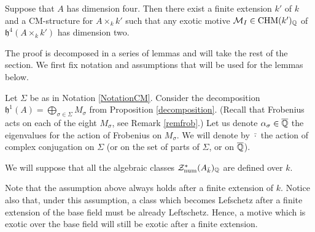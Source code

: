 \documentclass[11pt]{amsart}
\begin{document}
\begin{proposition}\label{exoticdim2}
Suppose that $A$ has dimension four. Then there exist a finite extension $k'$ of $k$ and a  CM-structure for $A\times_k k'$ such that any exotic motive $\mathcal{M}_I \in\mathrm{CHM} (k')_{\mathbb{Q}}$  of $\mathfrak{h}^{4}(A\times_k k')$ has dimension two. 
\end{proposition}

The proof is decomposed in a series of lemmas and will take the rest of the section. We first fix notation and assumptions that will be used for the lemmas below.
\begin{notation}\label{notnotnot}
Let $\Sigma$ be as in Notation \ref{NotationCM}. Consider the decomposition $\mathfrak{h}^1(A) =\bigoplus_{\sigma \in \Sigma} M_\sigma$ from Proposition \ref{decomposition}. (Recall that  Frobenius acts on each of the eight $ M_\sigma$, see Remark \ref{remfrob}.) Let us denote  $\alpha_\sigma \in \overline{\mathbb{Q}}$ the  eigenvalues for the action of  Frobenius on  $ M_\sigma$. We will denote by $\bar{\cdot}$ the action of  complex conjugation on $ \Sigma$ (or on the set of parts of $ \Sigma$, or on $\overline{\mathbb{Q}}$). 
 
\end{notation}
\begin{assumption}\label{assumassum}
We will suppose that all the algebraic classes $\mathcal{Z}^*_{\mathrm{num}} (A_{\bar{k}})_{\mathbb{Q}}$ are defined over $k$. \end{assumption}
\begin{remark}\label{assumptionlef}
Note that the assumption above always holds after a finite extension of $k$. Notice also that, under this assumption, a class which becomes Lefschetz after a finite extension of the base field must be already Leftschetz. Hence, a motive which is exotic over the base field will still be exotic after a finite extension.
\end{remark}
\end{document}
